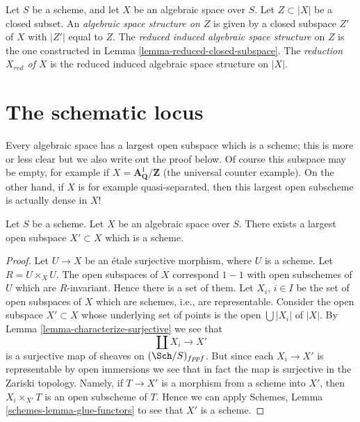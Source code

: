 \begin{definition}
\label{definition-reduced-induced-space}
Let $S$ be a scheme, and let $X$ be an algebraic space over $S$.
Let $Z \subset |X|$ be a closed subset.
An {\it algebraic space structure on $Z$} is given by a closed subspace
$Z'$ of $X$ with $|Z'|$ equal to $Z$.
The {\it reduced induced algebraic space structure}
on $Z$ is the one constructed in
Lemma \ref{lemma-reduced-closed-subspace}.
The {\it reduction $X_{red}$ of $X$} is the reduced induced algebraic
space structure on $|X|$.
\end{definition}











\section{The schematic locus}
\label{section-schematic}

\noindent
Every algebraic space has a largest open subspace which is a
scheme; this is more or less clear but we also write out the proof below.
Of course this subspace may be empty, for example if
$X = \mathbf{A}^1_{\mathbf{Q}}/\mathbf{Z}$ (the universal
counter example). On the other hand, if $X$ is for example quasi-separated,
then this largest open subscheme is actually dense in $X$!

\begin{lemma}
\label{lemma-subscheme}
Let $S$ be a scheme.
Let $X$ be an algebraic space over $S$.
There exists a largest open subspace $X' \subset X$ which is a scheme.
\end{lemma}

\begin{proof}
Let $U \to X$ be an \'etale surjective morphism, where $U$ is a scheme.
Let $R = U \times_X U$. The open subspaces of $X$ correspond $1 - 1$
with open subschemes of $U$ which are $R$-invariant. Hence there is a
set of them. Let $X_i$, $i \in I$ be the set of open subspaces
of $X$ which are schemes, i.e., are representable. Consider the
open subspace $X' \subset X$ whose underlying set of points is
the open $\bigcup |X_i|$ of $|X|$. By
Lemma \ref{lemma-characterize-surjective}
we see that
$$
\coprod X_i \longrightarrow X'
$$
is a surjective map of sheaves on $(\Sch/S)_{fppf}$.
But since each $X_i \to X'$ is representable by open immersions
we see that in fact the map is surjective in the Zariski
topology. Namely, if $T \to X'$ is a morphism from a scheme
into $X'$, then $X_i \times_{X'} T$ is an open subscheme of $T$.
Hence we can apply
Schemes, Lemma \ref{schemes-lemma-glue-functors}
to see that $X'$ is a scheme.
\end{proof}


